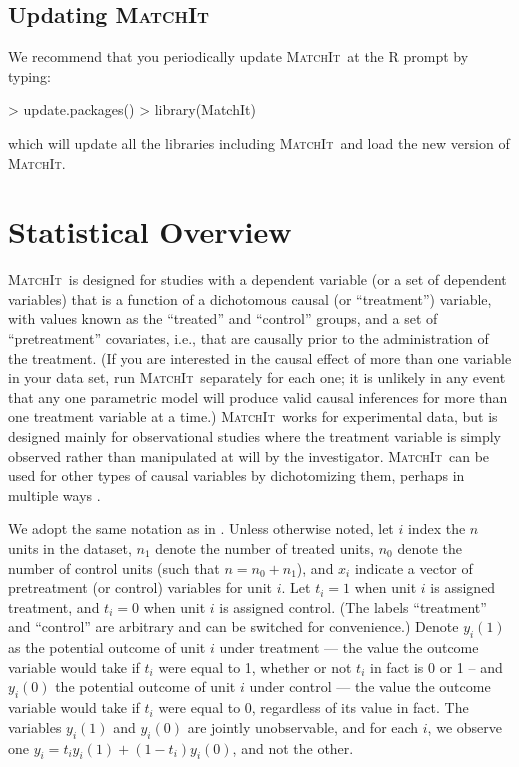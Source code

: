 \documentclass[oneside,letterpaper,titlepage]{article}
\newcommand{\MatchIt}{\textsc{MatchIt}}
\begin{document}
\subsection{Updating \MatchIt}

We recommend that you periodically update \MatchIt\ at the R prompt by typing:
\begin{Schunk}
\begin{Sinput}
> update.packages()
> library(MatchIt)
\end{Sinput}
\end{Schunk}
which will update all the libraries including \MatchIt\ and load the
new version of \MatchIt.


\section{Statistical Overview}

\MatchIt\ is designed for studies with a dependent variable (or a set
of dependent variables) that is a function of a dichotomous causal (or
``treatment'') variable, with values known as the ``treated'' and
``control'' groups, and a set of ``pretreatment'' covariates, i.e.,
that are causally prior to the administration of the treatment.  (If
you are interested in the causal effect of more than one variable in
your data set, run \MatchIt\ separately for each one; it is unlikely
in any event that any one parametric model will produce valid causal
inferences for more than one treatment variable at a time.)  \MatchIt\
works for experimental data, but is designed mainly for observational
studies where the treatment variable is simply observed rather than
manipulated at will by the investigator.  \MatchIt\ can be used for
other types of causal variables by dichotomizing them, perhaps in
multiple ways \citep[see also][]{ImaDyk04}.

We adopt the same notation as in \citet*{HoImaKin05}. Unless otherwise
noted, let $i$ index the $n$ units in the dataset, $n_1$ denote the
number of treated units, $n_0$ denote the number of control units
(such that $n=n_0+n_1$), and $x_i$ indicate a vector of pretreatment
(or control) variables for unit $i$.  Let $t_i=1$ when unit $i$ is
assigned treatment, and $t_i=0$ when unit $i$ is assigned control.
(The labels ``treatment'' and ``control'' are arbitrary and can be
switched for convenience.)  Denote $y_i(1)$ as the potential outcome
of unit $i$ under treatment --- the value the outcome variable would
take if $t_i$ were equal to 1, whether or not $t_i$ in fact is 0 or 1
-- and $y_i(0)$ the potential outcome of unit $i$ under control ---
the value the outcome variable would take if $t_i$ were equal to 0,
regardless of its value in fact.  The variables $y_i(1)$ and $y_i(0)$
are jointly unobservable, and for each $i$, we observe one
$y_i=t_iy_i(1)+(1-t_i)y_i(0)$, and not the other.
\end{document}
